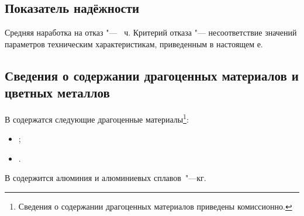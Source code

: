   \subsection{Показатель надёжности}
    Средняя наработка на отказ \genitivecasename "--- \MTBF~ч. 
    Критерий отказа "--- несоответствие значений параметров 
    техническим характеристикам, приведенным в 
    настоящем \MakeLowercase{\ESKDtheDocName}е.

  \subsection{Сведения о содержании драгоценных материалов и цветных
    металлов}
    \point В {\prepositionalcasename} содержатся следующие драгоценные 
      материалы\footnote{Сведения о содержании драгоценных материалов
      приведены комиссионно.}:

    \begin{itemize}
      \item {};
      \item {}.
    \end{itemize}

    \point В {\prepositionalcasename} содержится алюминия и алюминиевых
      \mbox{сплавов "---\qquad\qquad кг}.
